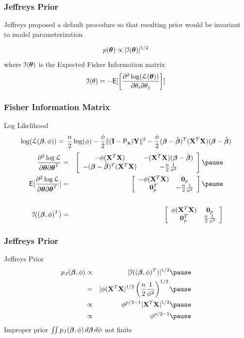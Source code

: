 \documentclass[handout]{beamer}\usepackage[]{graphicx}\usepackage[]{color}
\begin{document}
\begin{frame}
  \frametitle{Jeffreys Prior}

Jeffreys proposed a default  procedure so that resulting prior
would be invariant to model parameterization  \pause

$$p(\boldsymbol{\theta}) \propto |{\cal{I}}(\boldsymbol{\theta})|^{1/2}$$
\pause
where ${\cal{I}}(\boldsymbol{\theta})$ is the  Expected Fisher Information matrix
\pause
$$
{\cal{I}}(\theta) = - \textsf{E}[ \left[ \frac{\partial^2 \log({\cal{L}}(\boldsymbol{\theta}))}{\partial
  \theta_i \partial \theta_j} \right] ]
$$
\end{frame}
\begin{frame}
  \frametitle{Fisher Information Matrix}
Log Likelihood
$$
    \log({\cal{L}}(\boldsymbol{\beta}, \phi))  =  \, \frac{n}{2} \log(\phi)  - \frac{\phi}{2}
     \| (\mathbf{I} - \textsf{P}_{\mathbf{x}}) \mathbf{Y}\|^2
 - \frac{\phi}{2}(\boldsymbol{\beta} - \hat{\boldsymbol{\beta}})^T(\mathbf{X}^T\mathbf{X})(\boldsymbol{\beta} - \hat{\boldsymbol{\beta}})
$$ \pause
  \begin{eqnarray*}
\frac{\partial^2 \log \cL} { \partial \t \partial \t^T} & = &
\left[
  \begin{array}{cc}
    -\phi (\X^T\X) & -(\X^T\X) (\b - \bhat) \\
  - (\b - \bhat)^T (\X^T\X) & -\frac{n}{2} \frac{1}{\phi^2} \\
  \end{array}
\right] \pause \\
\E[\frac{\partial^2 \log \cL} { \partial \t \partial \t^T}] & = &
\left[
  \begin{array}{cc}
    -\phi (\X^T\X) & \zero_p \\
  \zero_p^T & -\frac{n}{2} \frac{1}{\phi^2} \\
  \end{array}
\right] \pause \\
& & \\
\cI((\b, \phi)^T) & = & \left[
  \begin{array}{cc}
    \phi (\X^T\X) & \zero_p \\
  \zero_p^T & \frac{n}{2} \frac{1}{\phi^2}
  \end{array}
\right]
  \end{eqnarray*}
\end{frame}
\begin{frame}
  \frametitle{Jeffreys Prior}
  Jeffreys Prior
  \begin{eqnarray*}
  p_J(\b, \phi)  & \propto & |\cI((\b, \phi)^T) |^{1/2}   \pause \\
               & = & |\phi (\X^T\X|^{1/2} \left(\frac{n}{2}
                 \frac{1}{\phi^2} \right)^{1/2} \pause \\
  & \propto  &  \phi^{p/2 - 1} |\X^T\X|^{1/2} \pause \\
  & \propto & \phi^{p/2 - 1}  \pause
  \end{eqnarray*}
  Improper prior   $\iint p_J(\boldsymbol{\beta}, \phi) \, d\boldsymbol{\beta} \, d\phi $ not finite

\end{frame}
\end{document}
